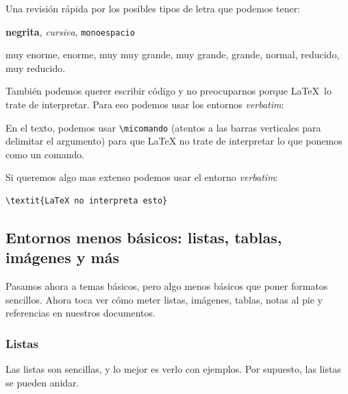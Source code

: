 Una revisión rápida por los posibles tipos de letra que podemos tener:

\begin{LTXexample}[pos=r]
\textbf{negrita}, \textit{cursiva}, \texttt{monoespacio}

\Huge{muy enorme}, \huge{enorme},
\LARGE{muy muy grande},
\Large{muy grande}, \large{grande},
\normalsize{normal}, \small{reducido},
\tiny{muy reducido}.
\end{LTXexample}

También podemos querer escribir código y no preocuparnos porque \LaTeX\ lo trate de interpretar. Para eso podemos usar los entornos \textit{verbatim}:

\begin{LTXexample}[pos=r]
En el texto, podemos usar
\verb|\micomando| (atentos
a las barras verticales para
delimitar el argumento)
para que \LaTeX{}
no trate de interpretar lo
que ponemos como un comando.

Si queremos algo mas extenso
podemos usar el entorno
\textit{verbatim}:

\begin{verbatim}
\textit{LaTeX no interpreta esto}
\end{verbatim}
\end{LTXexample}

\subsection{Entornos menos básicos: listas, tablas, imágenes y más}

Pasamos ahora a temas básicos, pero algo menos básicos que poner formatos sencillos. Ahora toca ver cómo meter listas, imágenes, tablas, notas al pie y referencias en nuestros documentos.

\subsubsection{Listas}

Las listas son sencillas, y lo mejor es verlo con ejemplos. Por supuesto, las listas se pueden anidar.


